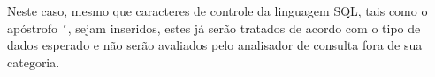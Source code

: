 \begin{frame}[fragile]{}

Neste caso, mesmo que caracteres de controle da linguagem SQL, tais
como o apóstrofo {\tt '}, sejam inseridos, estes já serão tratados de
acordo com o tipo de dados esperado e não serão avaliados pelo
analisador de consulta fora de sua categoria. 


\end{frame}


